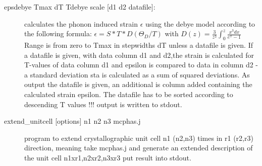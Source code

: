 \begin{description}
\item [\prg epsdebye\label{epsdebye} Tmax dT Tdebye scale {[d1 d2 datafile]}:]	        
		    calculates the phonon induced strain $\epsilon$ using the debye model
		    according to the following formula:
		    $   \epsilon=S*T*D(\Theta_{D}/T) $
				    with    
		    $D(z)=\frac{3}{z^3}\int_0^z \frac{x^3 dx}{e^x-1}$
                 Range is from zero to Tmax in stepwidths dT
		 unless a datafile is given. 
                 If a  datafile is given, with data column d1 and d2,the strain
                 is calculated for T-values of data column d1 and epsilon
		  is compared to data in column d2 - a standard 
                 deviation sta is calculated as a sum of squared deviations.
                 As output the datafile is given, an additional is column added 
		 containing the calculated strain epsilon. The datafile has to
		 be sorted according to descending T values !!!
                 output is written to stdout.
\item[\prg extend\_unitcell\label{extendunitcell} {[options]}  n1 n2 n3 mcphas.j] 
 program to extend crystallographic unit cell n1 (n2,n3) 
 times in r1 (r2,r3) direction, meaning take mcphas.j
 and generate an extended description of the unit cell 
 n1xr1,n2xr2,n3xr3 put result into stdout.


\end{description}
